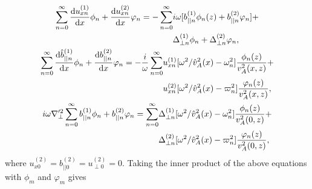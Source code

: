 \begin{gather}
    \begin{aligned}
    \sum_{n=0}^\infty \dv{u_{xn}^{(1)}}{x}\phi_n + \dv{u_{xn}^{(2)}}{x}\varphi_n = -\sum_{n=0}^\infty& i\omega[b_{||n}^{(1)}\phi_n(z)+b_{||n}^{(2)}\varphi_n] + \\
    &\Delta_{\perp n}^{(1)}\phi_n + \Delta_{\perp n}^{(2)}\varphi_n,
    \end{aligned} \\
    \begin{aligned}
    \sum_{n=0}^\infty \dv{\hat{b}_{||n}^{(1)}}{x}\phi_n + \dv{b_{||n}^{(2)}}{x}\varphi_n = -\frac{i}{\omega}\sum_{n=0}^\infty&u_{xn}^{(1)}[\omega^2/\hat{v}_A^2(x) - \omega_n^2]\frac{\phi_n(z)}{v_A^2(x,z)} + \\ &u_{xn}^{(2)}[\omega^2/\hat{v}_A^2(x) - \varpi_n^2]\frac{\varphi_n(z)}{v_A^2(x,z)},
    \end{aligned} \\
    \begin{aligned}
    i\omega\nabla_\perp'^2\sum_{n=0}^\infty b_{||n}^{(1)}\phi_n+b_{||n}^{(2)}\varphi_n=\sum_{n=0}^\infty& \Delta_{\perp n}^{(1)}[\omega^2/\hat{v}_A^2(x) - \omega_n^2]\frac{\phi_n(z)}{v_A^2(0,z)}+\\
    &\Delta_{\perp n}^{(2)}[\omega^2/\hat{v}_A^2(x) - \varpi_n^2]\frac{\varphi_n(z)}{v_A^2(0,z)},
    \end{aligned}
\end{gather}
where $u_{x0}^{(2)}=b_{||0}^{(2)}=u_{\perp0}^{(2)}=0$. Taking the inner product of the above equations with $\phi_m$ and $\varphi_m$ gives
